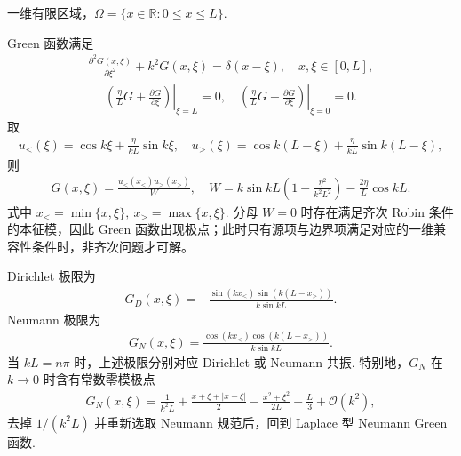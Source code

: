 \begin{exbox}
	一维有限区域，\(\Omega=\{x\in\mathbb{R}:0\leq x\leq L\}\).
	
	Green 函数满足
	\begin{align*}
		\frac{\partial^2G(x,\xi)}{\partial\xi^2}+k^2G(x,\xi)=\delta(x-\xi),\quad x,\xi\in[0,L],
	\end{align*}
	\begin{align*}
		\left.\left(\frac{\eta}{L}G+\frac{\partial G}{\partial\xi}\right)\right|_{\xi=L}=0,
		\quad
		\left.\left(\frac{\eta}{L}G-\frac{\partial G}{\partial\xi}\right)\right|_{\xi=0}=0.
	\end{align*}
	取
	\begin{align*}
		u_<(\xi)=\cos k\xi+\frac{\eta}{kL}\sin k\xi,
		\quad
		u_>(\xi)=\cos k(L-\xi)+\frac{\eta}{kL}\sin k(L-\xi),
	\end{align*}
	则
	\begin{align*}
		G(x,\xi)=\frac{u_<(x_<)u_>(x_>)}{W},
		\quad
		W=k\sin kL\left(1-\frac{\eta^2}{k^2L^2}\right)-\frac{2\eta}{L}\cos kL.
	\end{align*}
	式中 \(x_<=\min\{x,\xi\},\ x_>=\max\{x,\xi\}\). 分母 \(W=0\) 时存在满足齐次 Robin 条件的本征模，因此 Green 函数出现极点；此时只有源项与边界项满足对应的一维兼容性条件时，非齐次问题才可解。
	
	Dirichlet 极限为
	\begin{align*}
		G_D(x,\xi)=-\frac{\sin(kx_<)\sin(k(L-x_>))}{k\sin kL}.
	\end{align*}
	Neumann 极限为
	\begin{align*}
		G_N(x,\xi)=\frac{\cos(kx_<)\cos(k(L-x_>))}{k\sin kL}.
	\end{align*}
	当 \(kL=n\pi\) 时，上述极限分别对应 Dirichlet 或 Neumann 共振. 特别地，\(G_N\) 在 \(k\to0\) 时含有常数零模极点
	\begin{align*}
		G_N(x,\xi)=\frac{1}{k^2L}+\frac{x+\xi+|x-\xi|}{2}-\frac{x^2+\xi^2}{2L}-\frac{L}{3}+\mathcal{O}(k^2),
	\end{align*}
	去掉 \(1/(k^2L)\) 并重新选取 Neumann 规范后，回到 Laplace 型 Neumann Green 函数.
\end{exbox}

